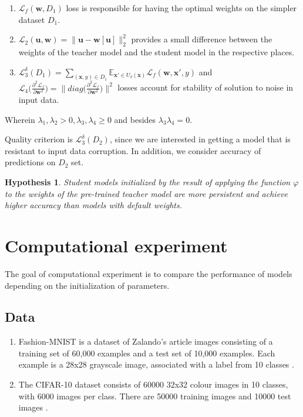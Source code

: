 \documentclass[80pt]{article}
\begin{document}
\begin{enumerate}
    \item $\mathcal{L}_f(\mathbf{w}, D_1)$ loss is responsible for having the optimal weights on the simpler dataset $D_1$.
    \item $\mathcal{L}_2 (\mathbf{u}, \mathbf{w}) = \|\textbf{u} - \textbf{w}[\textbf{u}]\|^2_2$ provides a small difference between the weights of the teacher model and the student model in the respective places.
    \item $\mathcal{L}_3^\delta (D_1) = \displaystyle \sum \limits_{(\textbf{x}, y) \in D_1} \displaystyle \mathbb{E}_{\textbf{x}' \in U_\delta(\textbf{x})} \mathcal{L}_f(\mathbf{w}, \textbf{x}', y)$  and  $\mathcal{L}_4 \bigl(\displaystyle \frac{\partial^2 \mathcal{L}_f}{\partial \mathbf{w}^2}\bigr) = \|diag{\bigl(\displaystyle \frac{\partial^2 \mathcal{L}_f}{\partial \mathbf{w}^2}\bigr)}\|^2$ losses account for stability of solution to noise in input data.
\end{enumerate}

Wherein $\lambda_1, \lambda_2 > 0, \lambda_3, \lambda_4 \ge 0$ and besides $\lambda_3 \lambda_4 = 0$.

Quality criterion is $\mathcal{L}_3^\delta (D_2)$, since we are interested in getting a model that is resistant to input data corruption. In addition, we consider accuracy of predictions on $D_2$ set.

\newtheorem{hypothesis}{Hypothesis}
\begin{hypothesis}
Student models initialized by the result of applying the function $\varphi$ to the weights of the pre-trained teacher model are more persistent and achieve higher accuracy than models with default weights.
\end{hypothesis}

\section{Computational experiment}

The goal of computational experiment is to compare the performance of models depending on the initialization of parameters. 

\subsection{Data}

\begin{enumerate}
    \item Fashion-MNIST is a dataset of Zalando's article images consisting of a training set of 60,000 examples and a test set of 10,000 examples. Each example is a 28x28 grayscale image, associated with a label from 10 classes  \citep{fashionmnist}.
    
    \item The CIFAR-10 dataset consists of 60000 32x32 colour images in 10 classes, with 6000 images per class. There are 50000 training images and 10000 test images \citep{cifar10}.
\end{enumerate}
\end{document}
